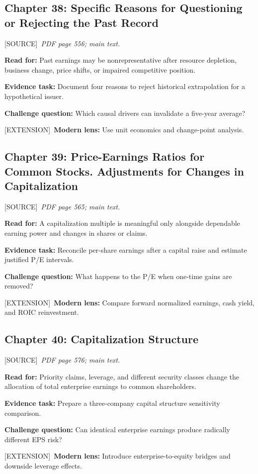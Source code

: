 \documentclass[11pt,letterpaper]{article}
\newcommand{\src}{\textsf{\color{sea}[SOURCE]}}
\newcommand{\ext}{\textsf{\color{gold}[EXTENSION]}}
\begin{document}
\subsection{Chapter 38: Specific Reasons for Questioning or Rejecting the Past Record}
\src\ \textit{PDF page 556; main text.}\par
\textbf{Read for:} Past earnings may be nonrepresentative after resource depletion, business change, price shifts, or impaired competitive position.\par
\textbf{Evidence task:} Document four reasons to reject historical extrapolation for a hypothetical issuer.\par
\textbf{Challenge question:} Which causal drivers can invalidate a five-year average?\par
\ext\ \textbf{Modern lens:} Use unit economics and change-point analysis.\par

\subsection{Chapter 39: Price-Earnings Ratios for Common Stocks. Adjustments for Changes in Capitalization}
\src\ \textit{PDF page 565; main text.}\par
\textbf{Read for:} A capitalization multiple is meaningful only alongside dependable earning power and changes in shares or claims.\par
\textbf{Evidence task:} Reconcile per-share earnings after a capital raise and estimate justified P/E intervals.\par
\textbf{Challenge question:} What happens to the P/E when one-time gains are removed?\par
\ext\ \textbf{Modern lens:} Compare forward normalized earnings, cash yield, and ROIC reinvestment.\par

\subsection{Chapter 40: Capitalization Structure}
\src\ \textit{PDF page 576; main text.}\par
\textbf{Read for:} Priority claims, leverage, and different security classes change the allocation of total enterprise earnings to common shareholders.\par
\textbf{Evidence task:} Prepare a three-company capital structure sensitivity comparison.\par
\textbf{Challenge question:} Can identical enterprise earnings produce radically different EPS risk?\par
\ext\ \textbf{Modern lens:} Introduce enterprise-to-equity bridges and downside leverage effects.\par
\end{document}
